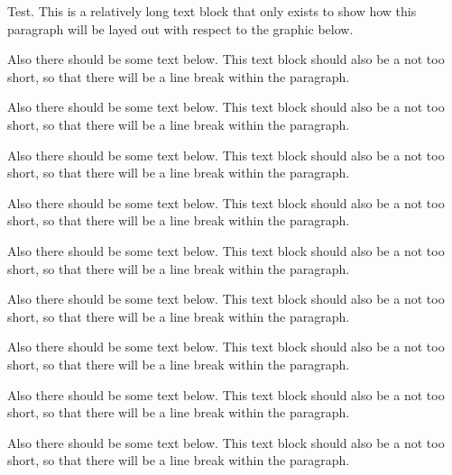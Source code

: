 \documentclass[a4paper]{article}
\begin{document}
Test. This is a relatively long text block that only exists
to show how this paragraph will be layed out with respect to 
the graphic below.
\begin{center}

\end{center}
Also there should be some text below. This text block
should also be a not too short, so that there will be a line
break within the paragraph.
\begin{center}

\end{center}
Also there should be some text below. This text block
should also be a not too short, so that there will be a line
break within the paragraph.
\begin{center}

\end{center}
Also there should be some text below. This text block
should also be a not too short, so that there will be a line
break within the paragraph.
\begin{center}

\end{center}
Also there should be some text below. This text block
should also be a not too short, so that there will be a line
break within the paragraph.
\begin{center}

\end{center}
Also there should be some text below. This text block
should also be a not too short, so that there will be a line
break within the paragraph.
\begin{center}

\end{center}
Also there should be some text below. This text block
should also be a not too short, so that there will be a line
break within the paragraph.
\begin{center}

\end{center}
Also there should be some text below. This text block
should also be a not too short, so that there will be a line
break within the paragraph.
\begin{center}

\end{center}
Also there should be some text below. This text block
should also be a not too short, so that there will be a line
break within the paragraph.
\begin{center}

\end{center}
Also there should be some text below. This text block
should also be a not too short, so that there will be a line
break within the paragraph.
\end{document}
